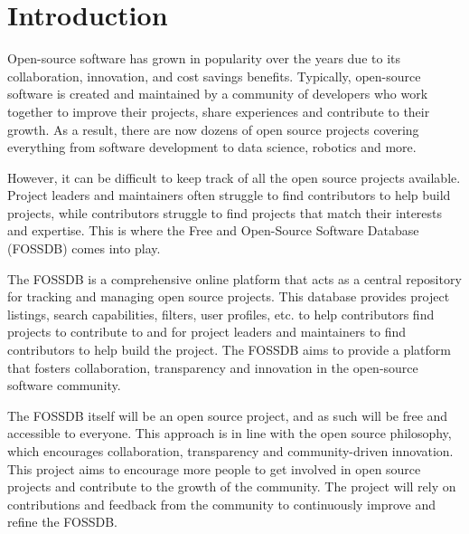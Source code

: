 \pagebreak
\section{Introduction}
Open-source software has grown in popularity over the years due to its collaboration, innovation, and cost savings benefits.
Typically, open-source software is created and maintained by a community of developers who work together to improve their projects, share experiences and contribute to their growth.
As a result, there are now dozens of open source projects covering everything from software development to data science, robotics and more.

However, it can be difficult to keep track of all the open source projects available.
Project leaders and maintainers often struggle to find contributors to help build projects, while contributors struggle to find projects that match their interests and expertise.
This is where the Free and Open-Source Software Database (FOSSDB) comes into play.

The FOSSDB is a comprehensive online platform that acts as a central repository for tracking and managing open source projects.
This database provides project listings, search capabilities, filters, user profiles, etc. to help contributors find projects to contribute to
and for project leaders and maintainers to find contributors to help build the project.
The FOSSDB aims to provide a platform that fosters collaboration, transparency and innovation in the open-source software community.

The FOSSDB itself will be an open source project, and as such will be free and accessible to everyone.
This approach is in line with the open source philosophy, which encourages collaboration, transparency and community-driven innovation.
This project aims to encourage more people to get involved in open source projects and contribute to the growth of the community.
The project will rely on contributions and feedback from the community to continuously improve and refine the FOSSDB.
